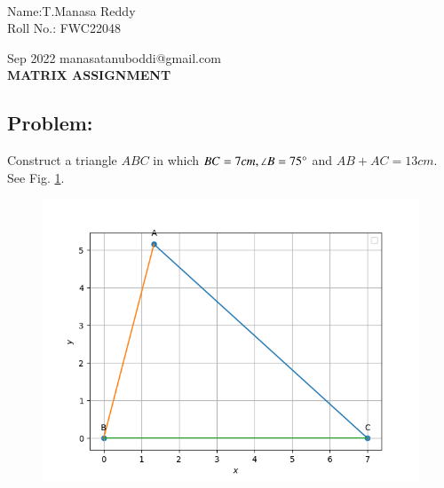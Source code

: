 \documentclass[10pt,a4paper]{report}
\begin{document}
 \vspace{3mm}\\ \raggedleft Name:T.Manasa Reddy\vspace{2mm}\\ \raggedleft Roll No.: FWC22048\vspace{2mm}\\ \raggedright Sep 2022 \hspace{12cm} \raggedleft manasatanuboddi@gmail.com \vspace{10mm}
\\ \centering \Large \textbf{MATRIX ASSIGNMENT} \normalsize \vspace{15mm}

\begin{multicols}{2}
\section{Problem:}  
\fi
	Construct a triangle $ABC$ in which $BC=7cm, \angle{B}=75\degree$ and $AB + AC = 13 cm$.
	\\
	\solution 
	See Fig. 
		\ref{fig:9/11/2/1}.
	\begin{figure}[!h]
		\centering
 \includegraphics[width=\columnwidth]{chapters/9/11/2/1/figs/Figure_1.png}
		\caption{}
		\label{fig:9/11/2/1}
  	\end{figure}
	
\iffalse
	\vspace{3mm}

\end{multicols}
\end{document}
